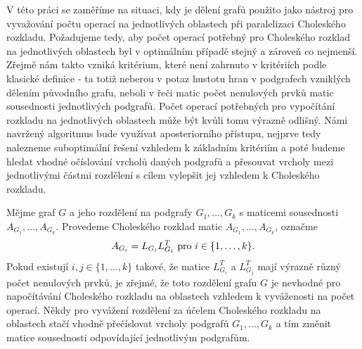 \documentclass{ctuthesis}
\theoremstyle{plain}
\theoremstyle{definition}
\begin{document}
V této práci se zaměříme na situaci, kdy je dělení grafů použito jako nástroj pro vyvažování počtu operací na jednotlivých oblastech při paralelizaci Choleského rozkladu. Požadujeme tedy, aby počet operací potřebný pro Choleského rozklad na jednotlivých oblastech byl v optimálním případě stejný a zároveň co nejmenší. Zřejmě nám takto vzniká kritérium, které není zahrnuto v kritériích podle klasické definice - ta totiž neberou v potaz hustotu hran v podgrafech vzniklých dělením původního grafu, neboli v řeči matic počet nenulových prvků matic sousednosti jednotlivých podgrafů. Počet operací potřebných pro vypočítání rozkladu na jednotlivých oblastech může být kvůli tomu výrazně odlišný. Námi navržený algoritmus bude využívat aposteriorního přístupu, nejprve tedy nalezneme suboptimální řešení vzhledem k základním kritériím a poté budeme hledat vhodné očíslování vrcholů daných podgrafů a přesouvat vrcholy mezi jednotlivými částmi rozdělení s cílem vylepšit jej vzhledem k Choleského rozkladu.

Mějme graf $G$ a jeho rozdělení na podgrafy $G_1, \ldots, G_k$ s maticemi sousednosti $A_{G_1}, \ldots, A_{G_k}$. Provedeme Choleského rozklad matic $A_{G_1}, \ldots, A_{G_k}$, označme
\[
  A_{G_i} = L_{G_i}L_{G_i}^T \ {\rm pro} \ i \in \{1,\ldots,k\}.
\]
Pokud existují $i,j \in \{1,\ldots,k \}$ takové, že matice $L_{G_i}^T$ a $L_{G_j}^T$ mají výrazně různý počet nenulových prvků, je zřejmé, že toto rozdělení grafu $G$ je nevhodné pro napočítávání Choleského rozkladu na oblastech vzhledem k vyváženosti na počet operací. Někdy pro vyvážení rozdělení za účelem Choleského rozkladu na oblastech stačí vhodně přečíslovat vrcholy podgrafů $G_1, \ldots, G_k$ a tím změnit matice sousednosti odpovídající jednotlivým podgrafům.
\end{document}
